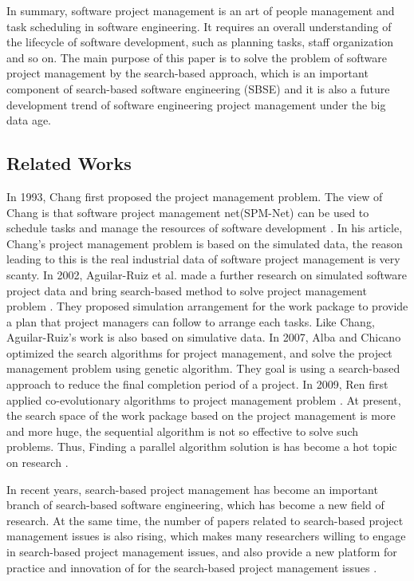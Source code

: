In summary, software project management is an art of people management and task
scheduling in software engineering. It requires an overall understanding of the
lifecycle of software development, such as planning tasks, staff organization
and so on. The main purpose of this paper is to solve the problem of software
project management by the search-based approach, which is an important component
of search-based software engineering (SBSE) and it is also a future development
trend of software engineering project management under the big data age.

\subsection{Related Works}
%
In 1993, Chang first proposed the project management problem. The view of Chang
is that software project management net(SPM-Net) can be used to schedule tasks
and manage the resources of software development \cite{chang}. In his article,
Chang's project management problem is based on the simulated data, the reason
leading to this is the real industrial data of software project management is
very scanty. In 2002, Aguilar-Ruiz et al. made a further research on simulated
software project data and bring search-based method to solve project management
problem \cite{alba}. They proposed simulation arrangement for the work package
to provide a plan that project managers can follow to arrange each tasks. Like
Chang, Aguilar-Ruiz's work is also based on simulative data. In 2007, Alba and
Chicano optimized the search algorithms for project management, and solve the
project management problem using genetic algorithm. They goal is using a
search-based approach to reduce the final completion period of a project. In
2009, Ren first applied co-evolutionary algorithms to project management problem
\cite{ren}. At present, the search space of the work package based on the
project management is more and more huge, the sequential algorithm is not so
effective to solve such problems. Thus, Finding a parallel algorithm solution is
has become a hot topic on research \cite{pentico}.

In recent years, search-based project management has become an important branch
of search-based software engineering, which has become a new field of
research. At the same time, the number of papers related to search-based project
management issues is also rising, which makes many researchers willing to engage
in search-based project management issues, and also provide a new platform for
practice and innovation of for the search-based project management issues
\cite{penta}.

